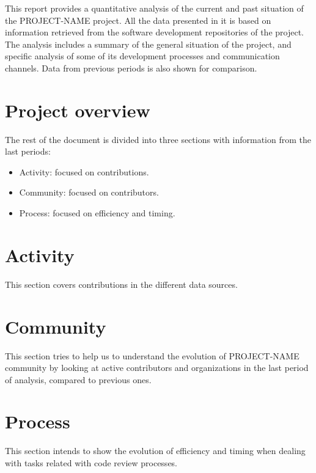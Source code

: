 \documentclass[a4wide,11pt]{article}
\begin{document}
This report provides a quantitative analysis of the current and past situation of the PROJECT-NAME project. All the data presented in it is based on information retrieved from the software development repositories of the project. The analysis includes a summary of the general situation of the project, and specific analysis of some of its development processes and communication channels. Data from previous periods is also shown for comparison.

\newpage

\setcounter{tocdepth}{4}
\setcounter{secnumdepth}{4}
\tableofcontents

\newpage

\section{Project overview} \label{overview}



The rest of the document is divided into three sections with information from the last periods: 

\begin{itemize}
\item Activity: focused on contributions. 
\item Community: focused on contributors.
\item Process: focused on efficiency and timing.
\end{itemize}

\section{Activity} \label{activity}
This section covers contributions in the different data sources.\\




\section{Community} \label{community}
This section tries to help us to understand the evolution of PROJECT-NAME community by looking at active contributors and organizations in the last period of analysis, compared to previous ones.\\




\section{Process} \label{process}
This section intends to show the evolution of efficiency and timing when dealing with tasks related with code review processes.\\
	
\end{document}
